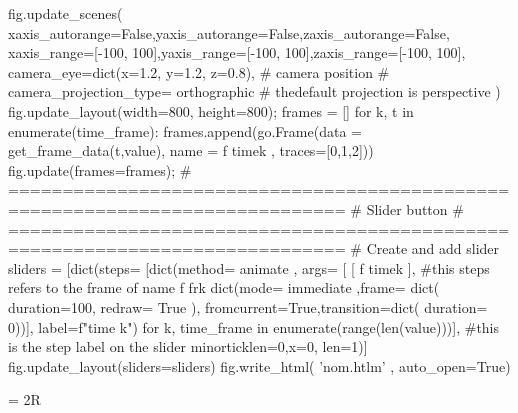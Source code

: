 \begin{customFrame}
fig.update_scenes( 
                  xaxis_autorange=False,yaxis_autorange=False,zaxis_autorange=False,
                  xaxis_range=[-100, 100],yaxis_range=[-100, 100],zaxis_range=[-100, 100], 
                  camera_eye=dict(x=1.2, y=1.2, z=0.8), 
                  # camera position # camera_projection_type= orthographic # thedefault projection is perspective
                  )
fig.update_layout(width=800, height=800);
frames = []
for  k, t in enumerate(time_frame):
    frames.append(go.Frame(data = get_frame_data(t,value),
                           name = f time{k} ,
                           traces=[0,1,2]))     
fig.update(frames=frames);  
# =============================================================================
#     Slider button
# =============================================================================   
# Create and add slider
sliders =  [dict(steps= [dict(method=  animate ,
                                               args= [ [ f time{k} ], #this steps refers to the frame of name f fr{k}
                                               dict(mode=  immediate ,frame= dict( duration=100, redraw= True ),
                                                    fromcurrent=True,transition=dict( duration= 0))],
                                                label=f"time {k}") for k, time_frame  in enumerate(range(len(value)))], #this is the step label on the slider 
                                  minorticklen=0,x=0, len=1)]
fig.update_layout(sliders=sliders)   
fig.write_html( 'nom.htlm' , auto_open=True) 

\end{customFrame}
 = 2R
